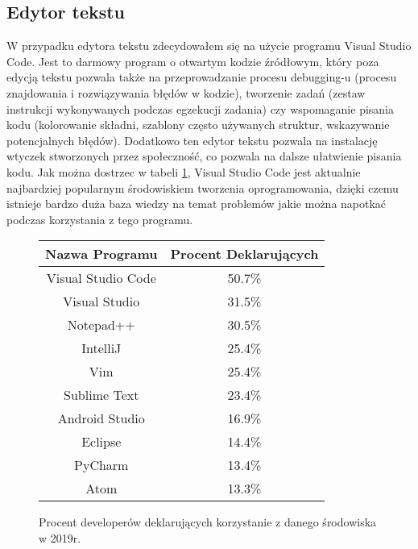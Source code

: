 \documentclass[a4paper,12pt,twoside,openany]{report}
\begin{document}
    \subsection{Edytor tekstu}
      W przypadku edytora tekstu zdecydowałem się na użycie programu 
      Visual Studio Code. Jest to darmowy program o otwartym kodzie źródłowym, który poza edycją tekstu 
      pozwala także na przeprowadzanie procesu debugging-u (procesu znajdowania i rozwiązywania błędów w kodzie),
      tworzenie zadań (zestaw instrukcji wykonywanych podczas egzekucji zadania) czy wspomaganie pisania kodu 
      (kolorowanie składni, szablony często używanych struktur, wskazywanie potencjalnych błędów).
      Dodatkowo ten edytor tekstu pozwala na instalację wtyczek stworzonych przez społeczność, 
      co pozwala na dalsze ułatwienie pisania kodu. Jak można dostrzec w tabeli \ref{srodowiskoProcenty},
      Visual Studio Code jest aktualnie najbardziej popularnym środowiskiem tworzenia oprogramowania, 
      dzięki czemu istnieje bardzo duża baza wiedzy na temat problemów jakie można napotkać podczas
      korzystania z tego programu.
      \begin{figure}[!htbp]
        \begin{center}
          \centering
            \begin{tabular}{|c|c|}
              \hline
              Nazwa Programu & Procent Deklarujących \\ \hline
              Visual Studio Code & 50.7\% \\ \hline
              Visual Studio & 31.5\% \\ \hline
              Notepad++ & 30.5\% \\ \hline
              IntelliJ & 25.4\% \\ \hline
              Vim & 25.4\% \\ \hline
              Sublime Text & 23.4\% \\ \hline
              Android Studio & 16.9\% \\ \hline
              Eclipse & 14.4\% \\ \hline
              PyCharm & 13.4\% \\ \hline
              Atom & 13.3\% \\
              \hline
            \end{tabular}
        \end{center}
        \caption{Procent developerów deklarujących korzystanie z danego środowiska w 2019r. \cite{StackInsight}}
        \label{srodowiskoProcenty}
      \end{figure}
\end{document}
